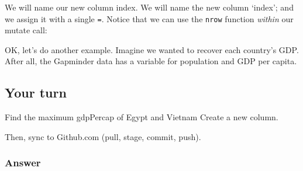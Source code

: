 \documentclass[]{book}
\newenvironment{Shaded}{\begin{snugshade}}{\end{snugshade}}
\newcommand{\KeywordTok}[1]{\textcolor[rgb]{0.13,0.29,0.53}{\textbf{{#1}}}}
\newcommand{\DataTypeTok}[1]{\textcolor[rgb]{0.13,0.29,0.53}{{#1}}}
\newcommand{\DecValTok}[1]{\textcolor[rgb]{0.00,0.00,0.81}{{#1}}}
\newcommand{\StringTok}[1]{\textcolor[rgb]{0.31,0.60,0.02}{{#1}}}
\newcommand{\CommentTok}[1]{\textcolor[rgb]{0.56,0.35,0.01}{\textit{{#1}}}}
\newcommand{\NormalTok}[1]{{#1}}
\theoremstyle{definition}
\theoremstyle{definition}
\theoremstyle{definition}
\theoremstyle{remark}
\begin{document}
We will name our new column index. We will name the new column `index';
and we assign it with a single \texttt{=}. Notice that we can use the
\texttt{nrow} function \emph{within} our mutate call:

\begin{Shaded}
\end{Shaded}

OK, let's do another example. Imagine we wanted to recover each
country's GDP. After all, the Gapminder data has a variable for
population and GDP per capita.

\begin{Shaded}
\end{Shaded}

\subsection{Your turn}\label{your-turn-6}

Find the maximum gdpPercap of Egypt and Vietnam Create a new column.

Then, sync to Github.com (pull, stage, commit, push).

\subsubsection{Answer}\label{answer-1}

\begin{Shaded}
\end{Shaded}
\end{document}
